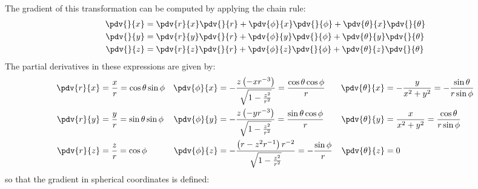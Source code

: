\documentclass{article}
\begin{document}
The gradient of this transformation can be computed by applying the
chain rule:
\begin{align*}
    \pdv{}{x} & = \pdv{r}{x} \pdv{}{r} + \pdv{\phi}{x} \pdv{}{\phi} + \pdv{\theta}{x} \pdv{}{\theta} \\
    \pdv{}{y} & = \pdv{r}{y} \pdv{}{r} + \pdv{\phi}{y} \pdv{}{\phi} + \pdv{\theta}{y} \pdv{}{\theta} \\
    \pdv{}{z} & = \pdv{r}{z} \pdv{}{r} + \pdv{\phi}{z} \pdv{}{\phi} + \pdv{\theta}{z} \pdv{}{\theta}
\end{align*}
The partial derivatives in these expressions are given by:
\begin{align*}
    \pdv{r}{x} & = \frac{x}{r} = \cos{\theta} \sin{\phi} & \pdv{\phi}{x} & = -\frac{z\left( - x r^{-3} \right)}{\sqrt{1 - \frac{z^2}{r^2}}} = \frac{\cos{\theta}\cos{\phi}}{r} & \pdv{\theta}{x} & = -\frac{y}{x^2 + y^2} = -\frac{\sin{\theta}}{r \sin{\phi}} \\
    \pdv{r}{y} & = \frac{y}{r} = \sin{\theta} \sin{\phi} & \pdv{\phi}{y} & = -\frac{z\left( - y r^{-3} \right)}{\sqrt{1 - \frac{z^2}{r^2}}} = \frac{\sin{\theta}\cos{\phi}}{r} & \pdv{\theta}{y} & = \frac{x}{x^2 + y^2} = \frac{\cos{\theta}}{r \sin{\phi}}   \\
    \pdv{r}{z} & = \frac{z}{r} = \cos{\phi}              & \pdv{\phi}{z} & = -\frac{\left( r - z^2r^{-1} \right)r^{-2}}{\sqrt{1 - \frac{z^2}{r^2}}} = -\frac{\sin{\phi}}{r}    & \pdv{\theta}{z} & = 0
\end{align*}
so that the gradient in spherical coordinates is defined:
\end{document}
